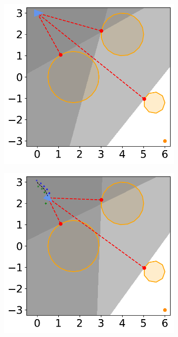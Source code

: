 \newpage
\begin{figure}[H]
    \centering
    \begin{subfigure}{0.35\textwidth}
        \centering
        \includegraphics[width=\textwidth]{figures/Simulations/sim1circles/frame_0.pdf}
    \end{subfigure}%
    \hfil
    \begin{subfigure}{0.35\textwidth}
        \centering
        \includegraphics[width=\textwidth]{figures/Simulations/sim1circles/frame_1.pdf}
    \end{subfigure}%
    

\end{figure}
